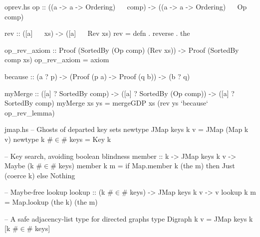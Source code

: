 \documentclass{beamer}
\begin{document}
\begin{filecontents*}{oprev.hs}
op :: ((a -> a -> Ordering) ~~ comp)
   -> ((a -> a -> Ordering) ~~ Op comp)

rev :: ([a] ~~ xs) -> ([a] ~~ Rev xs)
rev = defn . reverse . the

op_rev_axiom :: Proof (SortedBy (Op comp) (Rev xs))
             -> Proof (SortedBy comp xs)
op_rev_axiom = axiom
             
because :: (a ? p) -> (Proof (p a) -> Proof (q b)) -> (b ? q)
             
myMerge :: ([a] ? SortedBy comp)
        -> ([a] ? SortedBy (Op comp))
        -> ([a] ? SortedBy comp)
myMerge xs ys = mergeGDP xs (rev ys `because` op_rev_lemma)
\end{filecontents*}

\begin{filecontents*}{jmap.hs}
-- Ghosts of departed key sets
newtype JMap keys k v = JMap (Map k v)
newtype k #$\in$# keys      = Key k

-- Key search, avoiding boolean blindness
member :: k -> JMap keys k v -> Maybe (k #$\in$# keys)
member k m = if Map.member k (the m)
               then Just (coerce k)
               else Nothing
               
-- Maybe-free lookup
lookup :: (k #$\in$# keys) -> JMap keys k v -> v
lookup k m = Map.lookup (the k) (the m)

-- A safe adjacency-list type for directed graphs
type Digraph k v = JMap keys k [k #$\in$# keys]
\end{filecontents*}
\end{document}

